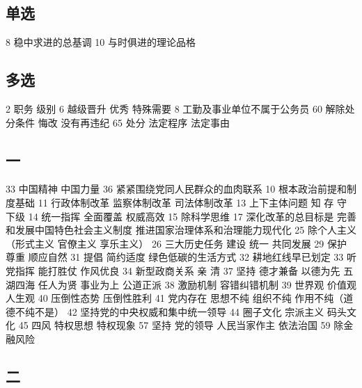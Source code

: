 \documentclass[11pt]{ctexart}
\begin{document}
\subsection{单选}
\label{sec:orgaa5985b}
8 稳中求进的总基调
10 与时俱进的理论品格
\subsection{多选}
\label{sec:orgd8d3b98}
2 职务 级别
6 越级晋升 优秀 特殊需要
8 工勤及事业单位不属于公务员
60 解除处分条件 悔改 没有再违纪
65 处分 法定程序 法定事由
\subsection{一}
\label{sec:orgdeee890}
33 中国精神 中国力量
36 紧紧围绕党同人民群众的血肉联系
10 根本政治前提和制度基础
11 行政体制改革 监察体制改革 司法体制改革
13 上下主体问题 知 存 守 下级
14 统一指挥 全面覆盖 权威高效
15 除科学思维
17 深化改革的总目标是
完善和发展中国特色社会主义制度
推进国家治理体系和治理能力现代化
25 除个人主义（形式主义 官僚主义 享乐主义）
26 三大历史任务 建设 统一 共同发展
29 保护 尊重 顺应自然
31 提倡 简约适度 绿色低碳的生活方式
32 耕地红线早已划定
33 听党指挥 能打胜仗 作风优良
34 新型政商关系 亲 清
37 坚持 德才兼备 以德为先 五湖四海 任人为贤 事业为上 公道正派
38 激励机制 容错纠错机制
39 世界观 价值观 人生观
40 压倒性态势 压倒性胜利
41 党内存在 思想不纯 组织不纯 作用不纯（道德不纯不是）
42 坚持党的中央权威和集中统一领导
44 圈子文化 宗派主义 码头文化
45 四风 特权思想 特权现象
57 坚持 党的领导 人民当家作主 依法治国
59 除金融风险
\subsection{二}
\label{sec:org83184da}
\end{document}
